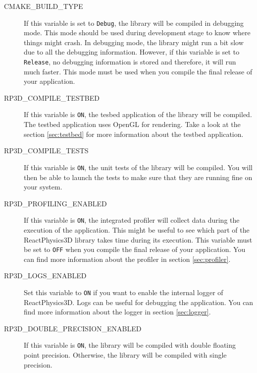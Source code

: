 \documentclass[a4paper,12pt]{article}
\begin{document}
       \begin{description}
         \item[CMAKE\_BUILD\_TYPE] If this variable is set to \texttt{Debug}, the library will be compiled in debugging mode.
                                                    This mode should be used during development stage to know where things might crash.
                                                    In debugging mode, the library might run a bit slow due to all the debugging information.
                                                    However, if this variable is set to \texttt{Release}, no debugging information is stored
                                                    and therefore, it will run much faster. This mode must be used when you compile the final
                                                    release of your application.

         \item[RP3D\_COMPILE\_TESTBED] If this variable is \texttt{ON}, the tesbed application of the library will be compiled.
                                                         The testbed application uses OpenGL for rendering.
                                                         Take a look at the section \ref{sec:testbed} for more information about the testbed application.

         \item[RP3D\_COMPILE\_TESTS] If this variable is \texttt{ON}, the unit tests of the library will be compiled. You will then
                                             be able to launch the tests to make sure that they are running fine on your system.

          \item[RP3D\_PROFILING\_ENABLED] If this variable is \texttt{ON}, the integrated profiler will collect data during the execution of the application.
                                                      This might be useful to see which part of the ReactPhysics3D
                                                      library takes time during its execution. This variable must be set to \texttt{OFF} when you compile
						      the final release of your application. You can find more information about the profiler in section \ref{sec:profiler}.

         \item[RP3D\_LOGS\_ENABLED] Set this variable to \texttt{ON} if you want to enable the internal logger of ReactPhysics3D. Logs can be useful for debugging the application.
		              You can find more information about the logger in section \ref{sec:logger}.

          \item[RP3D\_DOUBLE\_PRECISION\_ENABLED] If this variable is \texttt{ON}, the library will be compiled with double floating point precision.
                                                                    Otherwise, the library will be compiled with single precision.
       \end{description}
\end{document}
